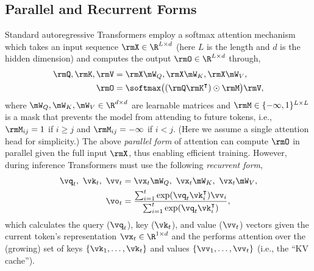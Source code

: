 \subsection{Parallel and Recurrent Forms}
\vspace{-2mm}
\label{subsec:background-lin}
Standard autoregressive Transformers employ a softmax attention mechanism which takes an input sequence $\rmX \in \R^{L \times d}$ (here $L$ is the length and $d$ is the hidden dimension) and computes the output $\rmO \in \R^{L \times d}$ through,
\begin{align*}
\rmQ, \rmK, \rmV &= \rmX \mW_Q, \rmX \mW_K, \rmX \mW_V, \\  \rmO &= \softmax\big((\rmQ \rmK^\intercal) \odot \rmM \big) \rmV,
\end{align*}
where $\mW_Q, \mW_K, \mW_V \in \R^{d \times d}$ are learnable matrices and 
$\rmM \in \{-\infty,1\}^{L \times L}$ is a mask that prevents the model from attending to  future tokens, i.e., $\rmM_{ij}=1$ if $i\ge j$ and $\rmM_{ij}=-\infty$ if $i<j$. (Here we assume a single attention head for simplicity.) 
The above \textit{parallel form} of attention can compute $\rmO$ in parallel given the full input $\rmX$, thus enabling efficient training. However, during inference Transformers must use the following \emph{recurrent form},
\begin{align*}
\vq_t, \ \vk_t, \ \vv_t &= \vx_t \mW_Q, \  \vx_t \mW_K, \ \vx_t \mW_V, \\ \vo_t &= \frac{\sum_{i=1}^{t} \exp(\vq_t  \vk_i^\intercal)\vv_i}{\sum_{i =1} ^{t} \exp(\vq_t  \vk_i^\intercal)},
\end{align*}
which calculates the query ($\vq_t$), key ($\vk_t$), and value ($\vv_t$) vectors given the current token's representation $\vx_t \in \R^{1 \times d}$ and the performs attention over the (growing) set of keys $\{\vk_1, \dots, \vk_t\}$ and values   $\{\vv_1, \dots, \vv_t\}$ (i.e., the ``KV cache''). 

